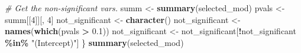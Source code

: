 \documentclass[
]{article}
\newenvironment{Shaded}{\begin{snugshade}}{\end{snugshade}}
\newcommand{\CommentTok}[1]{\textcolor[rgb]{0.56,0.35,0.01}{\textit{#1}}}
\newcommand{\DecValTok}[1]{\textcolor[rgb]{0.00,0.00,0.81}{#1}}
\newcommand{\FloatTok}[1]{\textcolor[rgb]{0.00,0.00,0.81}{#1}}
\newcommand{\FunctionTok}[1]{\textcolor[rgb]{0.13,0.29,0.53}{\textbf{#1}}}
\newcommand{\NormalTok}[1]{#1}
\newcommand{\OtherTok}[1]{\textcolor[rgb]{0.56,0.35,0.01}{#1}}
\newcommand{\SpecialCharTok}[1]{\textcolor[rgb]{0.81,0.36,0.00}{\textbf{#1}}}
\newcommand{\StringTok}[1]{\textcolor[rgb]{0.31,0.60,0.02}{#1}}
\begin{document}
\begin{Shaded}
\begin{Highlighting}[]
  \CommentTok{\# Get the non{-}significant vars.}
\NormalTok{  summ }\OtherTok{\textless{}{-}} \FunctionTok{summary}\NormalTok{(selected\_mod)}
\NormalTok{  pvals }\OtherTok{\textless{}{-}}\NormalTok{ summ[[}\DecValTok{4}\NormalTok{]][, }\DecValTok{4}\NormalTok{]}
\NormalTok{  not\_significant }\OtherTok{\textless{}{-}} \FunctionTok{character}\NormalTok{()}
\NormalTok{  not\_significant }\OtherTok{\textless{}{-}} \FunctionTok{names}\NormalTok{(}\FunctionTok{which}\NormalTok{(pvals }\SpecialCharTok{\textgreater{}} \FloatTok{0.1}\NormalTok{))}
\NormalTok{  not\_significant }\OtherTok{\textless{}{-}}\NormalTok{ not\_significant[}\SpecialCharTok{!}\NormalTok{not\_significant }\SpecialCharTok{\%in\%} \StringTok{"(Intercept)"}\NormalTok{]}
\NormalTok{\}}
\FunctionTok{summary}\NormalTok{(selected\_mod)}
\end{Highlighting}
\end{Shaded}
\end{document}
